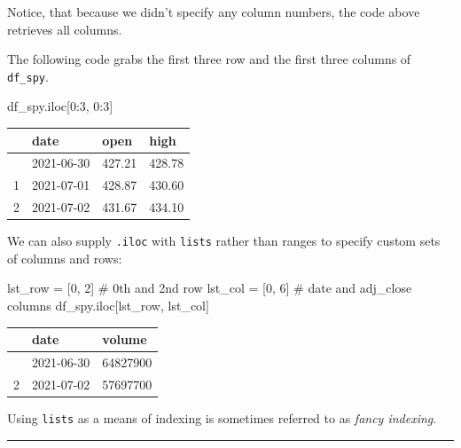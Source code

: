 \documentclass[
  letterpaper,
  DIV=11,
  numbers=noendperiod]{scrreprt}
\newenvironment{Shaded}{\begin{snugshade}}{\end{snugshade}}
\newcommand{\CommentTok}[1]{\textcolor[rgb]{0.37,0.37,0.37}{#1}}
\newcommand{\DecValTok}[1]{\textcolor[rgb]{0.68,0.00,0.00}{#1}}
\newcommand{\NormalTok}[1]{\textcolor[rgb]{0.00,0.23,0.31}{#1}}
\newcommand{\OperatorTok}[1]{\textcolor[rgb]{0.37,0.37,0.37}{#1}}
\begin{document}
Notice, that because we didn't specify any column numbers, the code
above retrieves all columns.

The following code grabs the first three row and the first three columns
of \texttt{df\_spy}.

\begin{Shaded}
\begin{Highlighting}[]
\NormalTok{df\_spy.iloc[}\DecValTok{0}\NormalTok{:}\DecValTok{3}\NormalTok{, }\DecValTok{0}\NormalTok{:}\DecValTok{3}\NormalTok{]}
\end{Highlighting}
\end{Shaded}

\begin{longtable}[]{@{}llll@{}}
\toprule\noalign{}
& date & open & high \\
\midrule\noalign{}
\endhead
\bottomrule\noalign{}
\endlastfoot
0 & 2021-06-30 & 427.21 & 428.78 \\
1 & 2021-07-01 & 428.87 & 430.60 \\
2 & 2021-07-02 & 431.67 & 434.10 \\
\end{longtable}

We can also supply \texttt{.iloc} with \texttt{lists} rather than ranges
to specify custom sets of columns and rows:

\begin{Shaded}
\begin{Highlighting}[]
\NormalTok{lst\_row }\OperatorTok{=}\NormalTok{ [}\DecValTok{0}\NormalTok{, }\DecValTok{2}\NormalTok{] }\CommentTok{\# 0th and 2nd row}
\NormalTok{lst\_col }\OperatorTok{=}\NormalTok{ [}\DecValTok{0}\NormalTok{, }\DecValTok{6}\NormalTok{] }\CommentTok{\# date and adj\_close columns}
\NormalTok{df\_spy.iloc[lst\_row, lst\_col]}
\end{Highlighting}
\end{Shaded}

\begin{longtable}[]{@{}lll@{}}
\toprule\noalign{}
& date & volume \\
\midrule\noalign{}
\endhead
\bottomrule\noalign{}
\endlastfoot
0 & 2021-06-30 & 64827900 \\
2 & 2021-07-02 & 57697700 \\
\end{longtable}

Using \texttt{lists} as a means of indexing is sometimes referred to as
\emph{fancy indexing}.

\begin{center}\rule{0.5\linewidth}{0.5pt}\end{center}
\end{document}
